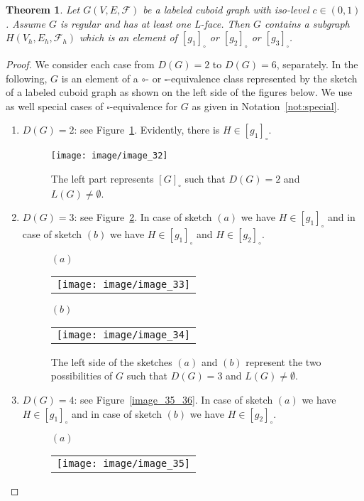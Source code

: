 \documentclass[a4paper,11pt]{article}
\newtheorem{theorem}{Theorem}[section]
\begin{document}
\begin{theorem}\label{thm:class-1}
Let $G(V,E,\mathcal{F})$ be a labeled cuboid graph with iso-level $c\in (0,1)$. Assume $G$ is regular and
has at least one L-face. Then $G$ contains a subgraph $H(V_h,E_h,\mathcal{F}_h)$ which is an element of
$[g_1]_{\circ}$ or $[g_2]_{\circ}$ or $[g_3]_{\square}$.
\end{theorem}
\begin{proof}
We consider each case from $D(G)=2$ to $D(G)=6$, separately. In the following, $G$ is an element of a
$\circ$- or $\square$-equivalence class represented by the sketch of a labeled cuboid graph as shown on
the left side of the figures below. We use as well special cases of $\square$-equivalence for $G$ as given
in Notation~\ref{not:special}.
\begin{enumerate}
\item $D(G)=2$: see Figure~\ref{image_32}. Evidently, there is $H\in [g_1]_{\circ}$.
\begin{figure}[!ht]
\texttt{[image: image/image\_32]}
\caption{The left part represents $[G]_{\circ}$ such that $D(G)=2$ and $L(G)\neq\emptyset$.}
\label{image_32}
\end{figure}
\FloatBarrier
\item $D(G)=3$: see Figure~\ref{image_33_34}. In case of sketch $(a)$ we have $H\in [g_1]_{\circ}$ and in case
of sketch $(b)$ we have $H\in [g_1]_{\circ}$ and $H\in [g_2]_{\circ}$.
\begin{figure}[!ht]
$(a)$
\begin{tabular}[c]{l}
\texttt{[image: image/image\_33]}
\end{tabular}
\hspace{1cm}$(b)$
\begin{tabular}[c]{l}
\texttt{[image: image/image\_34]}
\end{tabular}
\caption{The left side of the sketches $(a)$ and $(b)$ represent the two possibilities of $G$ such that $D(G)=3$ and
$L(G)\neq\emptyset$.}
\label{image_33_34}
\end{figure}
\FloatBarrier
\item $D(G)=4$: see Figure~\ref{image_35_36}. In case of sketch $(a)$ we have $H\in [g_1]_{\circ}$ and in case
of sketch $(b)$ we have $H\in [g_2]_{\circ}$.
\begin{figure}[!ht]
$(a)$
\begin{tabular}[c]{l}
\texttt{[image: image/image\_35]}
\end{tabular}

\end{figure}
\end{enumerate}
\end{proof}
\end{document}

